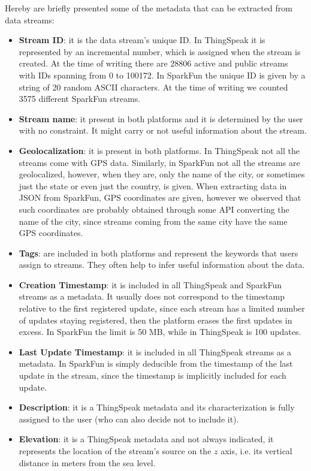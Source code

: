 Hereby are briefly presented some of the metadata that can be extracted from data streams:
\begin{itemize}
 \item \textbf{Stream ID}: it is the data stream's unique ID. In ThingSpeak it is represented by an incremental number, which is assigned when the stream is created. At the time of writing there are 28806 active and public streams with IDs spanning from 0 to 100172. In SparkFun the unique ID is given by a string of 20 random ASCII characters. At the time of writing we counted 3575 different SparkFun streams. 
 \item \textbf{Stream name}: it present in both platforms and it is determined by the user with no constraint. It might carry or not useful information about the stream.
 \item \textbf{Geolocalization}: it is present in both platforms. In ThingSpeak not all the streams come with GPS data. Similarly, in SparkFun not all the streams are geolocalized, however, when they are, only the name of the city, or sometimes just the state or even just the country, is given. When extracting data in JSON from SparkFun, GPS coordinates are given, however we observed that such coordinates are probably obtained through some API converting the name of the city, since streams coming from the same city have the same GPS coordinates.
 \item \textbf{Tags}: are included in both platforms and represent the keywords that users assign to streams. They often help to infer useful information about the data. 
 \item \textbf{Creation Timestamp}: it is included in all ThingSpeak and SparkFun streams as a metadata. It usually does not correspond to the timestamp relative to the first registered update, since each stream has a limited number of updates staying registered, then the platform erases the first updates in excess. In SparkFun the limit is 50 MB, while in ThingSpeak is 100 updates.
 \item \textbf{Last Update Timestamp}: it is included in all ThingSpeak streams as a metadata. In SparkFun is simply deducible from the timestamp of the last update in the stream, since the timestamp is implicitly included for each update.
 \item \textbf{Description}: it is a ThingSpeak metadata and its characterization is fully assigned to the user (who can also decide not to include it).
 \item \textbf{Elevation}: it is a ThingSpeak metadata and not always indicated, it represents the location of the stream's source on the $z$ axis, i.e. its vertical distance in meters from the sea level.

\end{itemize}
